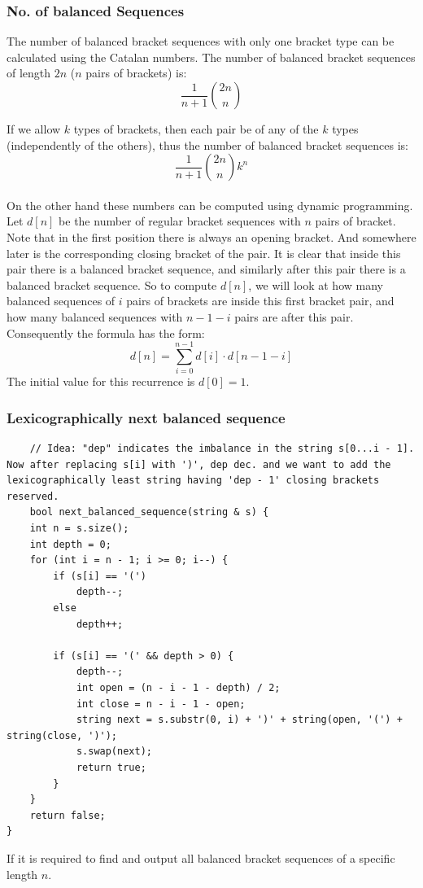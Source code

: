 \documentclass[8pt, a4paper, oneside, twocolumn]{extarticle}
\begin{document}
\subsubsection{No. of balanced Sequences}
The number of balanced bracket sequences with only one bracket type can be calculated using the Catalan numbers. The number of balanced bracket sequences of length $2n$ ($n$ pairs of brackets) is: $$\frac{1}{n+1} \binom{2n}{n}$$

If we allow $k$ types of brackets, then each pair be of any of the $k$ types (independently of the others), thus the number of balanced bracket sequences is: $$\frac{1}{n+1} \binom{2n}{n} k^n$$\\
On the other hand these numbers can be computed using dynamic programming. Let $d[n]$ be the number of regular bracket sequences with $n$ pairs of bracket. Note that in the first position there is always an opening bracket. And somewhere later is the corresponding closing bracket of the pair. It is clear that inside this pair there is a balanced bracket sequence, and similarly after this pair there is a balanced bracket sequence. So to compute $d[n]$, we will look at how many balanced sequences of $i$ pairs of brackets are inside this first bracket pair, and how many balanced sequences with $n-1-i$ pairs are after this pair. Consequently the formula has the form: $$d[n] = \sum_{i=0}^{n-1} d[i] \cdot d[n-1-i]$$ The initial value for this recurrence is $d[0] = 1$.
\subsubsection{Lexicographically next balanced sequence}
\begin{verbatim}
	// Idea: "dep" indicates the imbalance in the string s[0...i - 1]. Now after replacing s[i] with ')', dep dec. and we want to add the lexicographically least string having 'dep - 1' closing brackets reserved.
	bool next_balanced_sequence(string & s) {
    int n = s.size();
    int depth = 0;
    for (int i = n - 1; i >= 0; i--) {
        if (s[i] == '(')
            depth--;
        else
            depth++;

        if (s[i] == '(' && depth > 0) {
            depth--;
            int open = (n - i - 1 - depth) / 2;
            int close = n - i - 1 - open;
            string next = s.substr(0, i) + ')' + string(open, '(') + string(close, ')');
            s.swap(next);
            return true;
        }
    }
    return false;
}
\end{verbatim}
If it is required to find and output all balanced bracket sequences of a specific length $n$.
\end{document}
